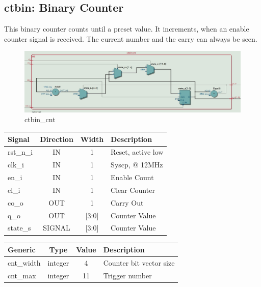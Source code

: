 \documentclass[12pt,a4 paper] {report}
\begin{document}
\newpage

\subsection{ctbin: Binary Counter}
This binary counter counts until a preset value. It increments, when an enable counter signal is received. The current 
number and the carry can always be seen.
\begin{figure}[h]
	\centering	
	\includegraphics[scale=0.3]{../png/ctbin_cnt.png}
	\caption{ctbin\_cnt}
\end{figure}
\begin{center}
	\begin{tabular}{ | p{2cm} | c | c | p{5cm} |}
		\hline
		\textbf{Signal} & \textbf{Direction} & \textbf{Width} & \textbf{Description} \\
		\hline
		\hline
 		 rst\_n\_i & IN & 1 & Reset, active low \\
 		 \hline
		clk\_i & IN & 1 & Syscp, @ 12MHz \\
		\hline
		en\_i & IN & 1 & Enable Count \\
		\hline
		cl\_i & IN & 1 & Clear Counter \\
		\hline
		co\_o & OUT & 1 & Carry Out \\
		\hline
		q\_o & OUT & [3:0] & Counter Value \\
		\hline
		\hline
		state\_s & SIGNAL & [3:0] & Counter Value \\
		\hline
	\end{tabular}
\end{center}
\begin{center}
	\begin{tabular}{| p{2cm} | c | c | p{5cm} |}
		\hline
		\textbf{Generic} & \textbf{Type} & \textbf{Value} & \textbf{Description} \\
		\hline
 		cnt\_width & integer & 4 & Counter bit vector size \\
		\hline
		cnt\_max & integer & 11 & Trigger number \\
		\hline
	\end{tabular}	
\end{center}
\end{document}

